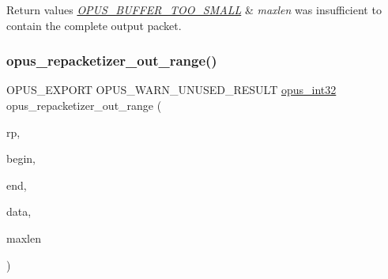 \begin{DoxyRetVals}{Return values}
{\em \hyperlink{group__opus__errorcodes_gacd897c05563ec04a67d8e92ba29f3d4f}{O\+P\+U\+S\+\_\+\+B\+U\+F\+F\+E\+R\+\_\+\+T\+O\+O\+\_\+\+S\+M\+A\+LL}} & {\itshape maxlen} was insufficient to contain the complete output packet. \\
\hline
\end{DoxyRetVals}
\mbox{\label{group__opus__repacketizer_gad06762a8f4032823f6b64b63e8416efc}} 
\subsubsection{\texorpdfstring{opus\+\_\+repacketizer\+\_\+out\+\_\+range()}{opus\_repacketizer\_out\_range()}}
{\footnotesize\ttfamily O\+P\+U\+S\+\_\+\+E\+X\+P\+O\+RT O\+P\+U\+S\+\_\+\+W\+A\+R\+N\+\_\+\+U\+N\+U\+S\+E\+D\+\_\+\+R\+E\+S\+U\+LT \hyperlink{opus__types_8h_aa4d309d6f80b99dbabebc8f98879ab9a}{opus\+\_\+int32} opus\+\_\+repacketizer\+\_\+out\+\_\+range (\begin{DoxyParamCaption}\item[{\hyperlink{group__opus__repacketizer_ga1f85070a64bcbf5bf24f5ccb80323e7b}{Opus\+Repacketizer} $\ast$}]{rp,  }\item[{int}]{begin,  }\item[{int}]{end,  }\item[{unsigned char $\ast$}]{data,  }\item[{\hyperlink{opus__types_8h_aa4d309d6f80b99dbabebc8f98879ab9a}{opus\+\_\+int32}}]{maxlen }\end{DoxyParamCaption})}

